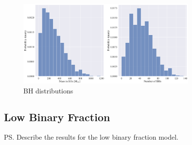 
\begin{figure}
	\centering
	\includegraphics[width=0.8\textwidth]{figures/prev_nobin/BH_dists.png}
	\caption{BH distributions}
	\label{fig:prev_nobin_BH_dists}
\end{figure}


\subsection{Low Binary Fraction}
\ps{Describe the results for the low binary fraction model.}


